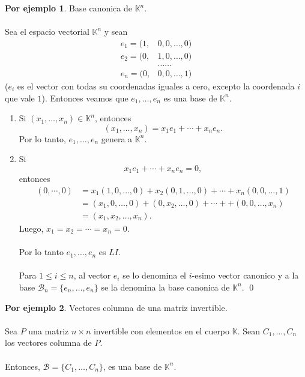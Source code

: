 \documentclass{article}
\theoremstyle{definition}
\theoremstyle{definition}
\newtheorem*{ej}{Por ejemplo}
\theoremstyle{remark}
\begin{document}
\begin{ej}
  Base canonica de $\mathbb{K}^n$. \\\\ Sea el espacio vectorial $\mathbb{K}^n$ y sean \[
    \begin{aligned}
      e_1 =(1,&0,0,\dots,0) \\
      e_2 = (0,&1,0,\dots,0) \\
               &\dots \dots \\
      e_n = (0,&0,0,\dots ,1)
    \end{aligned}
  \]
  ($e_i$ es el vector con todas su coordenadas iguales a cero, excepto la coordenada $i$ que vale $1$). Entonces veamos que $e_1,\dots,e_n$ es una base de $\mathbb{K}^n$. \begin{enumerate}
    \item Si $(x_1,\dots,x_n) \in \mathbb{K}^n$, entonces \[
        (x_1, \dots ,x_n) = x_1 e_1 + \cdots + x_n e_n.
      \]
      Por lo tanto, $e_1, \dots, e_n$ genera a $\mathbb{K}^n$.
    \item Si \[
x_1e_1 + \cdots + x_ne_n = 0,
      \]
      entonces \[
        \begin{aligned}
          (0,\cdots , 0) &= x_1(1,0,\dots , 0) + x_2(0,1,\dots , 0)+\cdots + x_n(0,0,\dots , 1) \\
                         &= (x_1, 0 , \dots ,0 ) + (0, x_2 , \dots ,0) + \cdots + + (0,0,\dots ,x_n) \\
                         &= (x_1, x_2,\dots ,x_n). 
        \end{aligned}
      \]
      Luego, $x_1=x_2= \cdots = x_n = 0.$ \\\\ Por lo tanto $e_1,\dots,e_n$ es $LI$. \\\\ 
      Para $1 \leq i \leq n$, al vector $e_i$ se lo denomina el $i$-esimo vector canonico y a la base $\mathcal{B}_n=\{e_n,\dots,e_n\}$ se la denomina la base canonica de $\mathbb{K}^n$. \qed
    \end{enumerate}
\end{ej}
\begin{ej}
  Vectores columna de una matriz invertible. \\\\ Sea $P$ una matriz $ n \times n$ invertible con elementos en el cuerpo $\mathbb{K}$. Sean $C_1, \dots ,C_n$ los vectores columna de $P$. \\\\ Entonces, $\mathcal{B}=\{C_1,\dots , C_n \}$, es una base de $\mathbb{K}^n$.
\end{ej}
\end{document}
